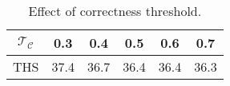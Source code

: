 \begin{table}[ht]
    \centering
    \begin{tabular}{c|ccccc}
        \hline
        \( \mathcal{T}_{\mathcal{C}} \) & 0.3 & 0.4 & 0.5 & 0.6 & 0.7 \\ \hline
        THS & 37.4 & 36.7 & 36.4 & 36.4 & 36.3 \\ \hline
    \end{tabular}
    \caption{Effect of correctness threshold.}
    \label{tab:ths_tc_results}
\end{table}
